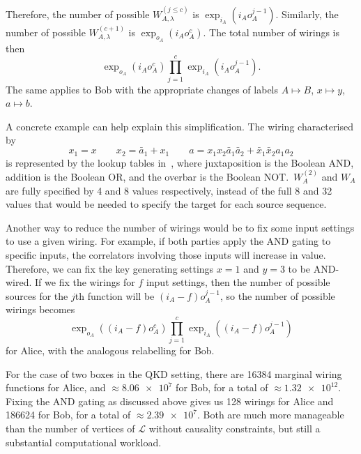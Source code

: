 \documentclass[10pt, a4paper]{article}
\numberwithin{equation}{section} %
\theoremstyle{definition}
\theoremstyle{plain}
\newcommand{\?}{\mathrel{?}} %
\newcommand{\Ls}{\mathcal{L}}
\begin{document}
      Therefore, the number of possible \(W^{(j\leq c)}_{A,\lambda}\) is \(\exp_{i_A}(i_A o_A^{j-1})\). Similarly, the number of possible \(W_{A,\lambda}^{(c+1)}\) is \(\exp_{o_A}(i_A o_A^{c})\). The total number of wirings is then
      \begin{equation}
        \exp_{o_A}(i_A o_A^c) \prod_{j=1}^c \exp_{i_A}(i_A o_A^{j-1}).
      \end{equation}
      The same applies to Bob with the appropriate changes of labels \(A \mapsto B\), \(x \mapsto y\), \(a \mapsto b\). 

      A concrete example can help explain this simplification. The wiring characterised by
      \begin{equation}
        x_1 = x \qquad x_2 = \bar{a}_1 + x_1 \qquad a = x_1x_2\bar{a}_1\bar{a}_2 + \bar{x}_1\bar{x}_2a_1a_2\label{eqn:wiringeg}
      \end{equation}
      is represented by the lookup tables in~, where juxtaposition is the Boolean AND, addition is the Boolean OR, and the overbar is the Boolean NOT.\ \(W_A^{(2)}\) and \(W_A\) are fully specified by 4 and 8 values respectively, instead of the full 8 and 32 values that would be needed to specify the target for each source sequence.

      Another way to reduce the number of wirings would be to fix some input settings to use a given wiring. For example, if both parties apply the AND gating to specific inputs, the correlators involving those inputs will increase in value. Therefore, we can fix the key generating settings \(x = 1\) and \(y = 3\) to be AND-wired. If we fix the wirings for \(f\) input settings, then the number of possible sources for the \(j\)th function will be \((i_A - f) o_A^{j-1}\), so the number of possible wirings becomes
      \begin{equation}
        \exp_{o_A}((i_A-f) o_A^c) \prod_{j=1}^c \exp_{i_A}((i_A-f) o_A^{j-1})
      \end{equation}
      for Alice, with the analogous relabelling for Bob.

      For the case of two boxes in the QKD setting, there are 16384 marginal wiring functions for Alice, and \(\approx \num{8.06e7}\) for Bob, for a total of \(\approx \num{1.32e12}\). Fixing the AND gating as discussed above gives us 128 wirings for Alice and 186624 for Bob, for a total of \(\approx \num{2.39e7}\). Both are much more manageable than the number of vertices of \(\Ls\) without causality constraints, but still a substantial computational workload.
\end{document}
